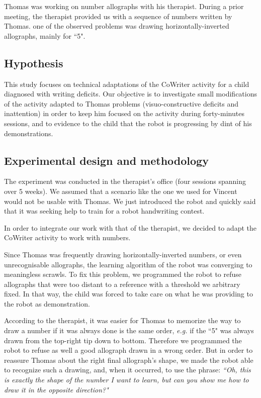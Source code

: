 \documentclass{sig-alternate}
\begin{document}
Thomas was working on number allographs with his therapist. During a prior
meeting, the therapist provided us with a sequence of numbers
written by Thomas. one of the observed problems was drawing
horizontally-inverted allographs, mainly for ``5".

\subsection{Hypothesis}
This study focuses on technical adaptations of the CoWriter activity for a 
child diagnosed with writing deficits.
Our objective is to investigate small modifications of the activity adapted to
Thomas problems (visuo-constructive deficits and inattention) in order to
keep him focused
on the activity during forty-minutes sessions, and to evidence to the child that the robot is progressing by dint of his demonstrations. 

\subsection{Experimental design and methodology}
The experiment was conducted in the therapist's office (four sessions 
spanning over 5 weeks). We assumed that a scenario like the one we used 
for Vincent would not be usable with Thomas. We just introduced the robot 
and quickly said that it was seeking help to train for a robot handwriting contest.

In order to integrate our work with that of the therapist, we decided to adapt the 
CoWriter activity to work with numbers.

Since Thomas was frequently drawing horizontally-inverted numbers, or even
unrecognisable allographs, the learning algorithm of the robot was converging to
meaningless scrawls. To fix this problem, we programmed the robot to refuse allographs that
were too distant to a reference with a threshold we arbitrary fixed. In that way,
the child was forced to take care on what he was providing to the robot as
demonstration. 

According to the therapist, it was easier for Thomas to memorize the way to draw
a number if it was always done is the same order, \emph{e.g.} if the ``5" was always
drawn from the top-right tip down to bottom. Therefore we programmed the robot to
refuse as well a good allograph drawn in a wrong order. But in order to reassure Thomas
about the right final allograph's shape, we made the robot able to recognize
such a drawing, and, when it occurred, to use the phrase:
\emph{``Oh, this is exactly the shape of the number I want to learn, but can you
show me how to draw it in the opposite direction?"}
\end{document}
